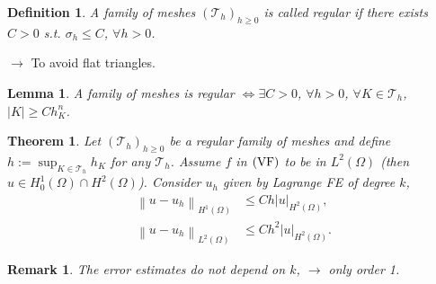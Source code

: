 \documentclass[11pt,a4paper,center,notitlepage]{article}
\numberwithin{equation}{section}
\newtheorem{lemma}{Lemma}[section]
\newtheorem{definition}{Definition}[section]
\newtheorem{theorem}{Theorem}[section]
\newtheorem{remark}{Remark}[section]
\begin{document}
\begin{definition}
A family of meshes $\left(\mathcal{T}_h\right)_{h\ge 0}$ is called \emph{regular} if there exists $C>0$ s.t. $\sigma _h\le C$, $\forall h>0$.
\end{definition}
$\to$ To avoid flat triangles.

\begin{lemma}
A family of meshes is regular $ \Leftrightarrow \exists C > 0$, $\forall h > 0$, $\forall K \in {\mathcal{T}_h}$, $\left| K \right| \ge Ch_K^n$.
\end{lemma}

\begin{theorem}
Let $\left(\mathcal{T}_h\right)_{h\ge 0}$ be a regular family of meshes and define $h := {\sup _{K \in {\mathcal{T}_h}}}{h_K}$ for any $\mathcal{T}_h$. Assume $f$ in $\left({\rm VF}\right)$ to be in $L^2 \left(\Omega\right)$ (then $u \in H_0^1\left( \Omega  \right) \cap {H^2}\left( \Omega  \right)$). Consider $u_h$ given by Lagrange FE of degree $k$,
\begin{align}
{\left\| {u - {u_h}} \right\|_{{H^1}\left( \Omega  \right)}} &\le Ch{\left| u \right|_{{H^2}\left( \Omega  \right)}},\\
{\left\| {u - {u_h}} \right\|_{{L^2}\left( \Omega  \right)}} &\le C{h^2}{\left| u \right|_{{H^2}\left( \Omega  \right)}}.
\end{align}
\end{theorem}

\begin{remark}
The error estimates do not depend on $k$, $\to$ only order 1.
\end{remark}
\end{document}
